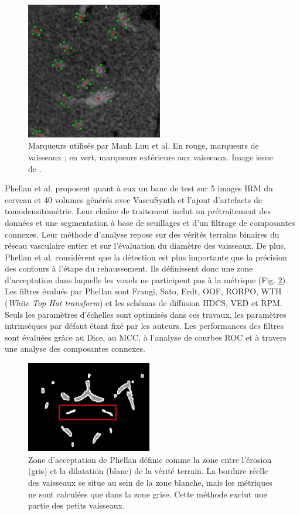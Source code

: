 \begin{figure}[!ht]
  \centering
  \includegraphics[height=6cm]{Images/ManhLuu_markers.png}
  \caption{Marqueurs utilisés par Manh Luu et al. En rouge, marqueurs de vaisseaux ; en vert, marqueurs extérieurs aux vaisseaux. Image issue de \cite{Luu2015_liver_vesselness_comparison}. }
  \label{fig:ManhLuu_markers}
\end{figure}

Phellan et al. \cite{Phellan2017_Brain_vesselness_comparison} proposent quant à eux un banc de test sur 5 images IRM du cerveau et 40 volumes générés avec VascuSynth et l'ajout d'artefacts de tomodensitométrie. Leur chaîne de traitement inclut un prétraitement des données et une segmentation à base de seuillages et d'un filtrage de composantes connexes. Leur méthode d'analyse repose sur des vérités terrains binaires du réseau vasculaire entier et sur l'évaluation du diamètre des vaisseaux. De plus, Phellan et al. considèrent que la détection est plus importante que la précision des contours à l'étape du rehaussement. Ils définissent donc une zone d'acceptation dans laquelle les voxels ne participent pas à la métrique (Fig. \ref{fig:Phellan_acceptance_zone}). Les filtres évalués par Phellan sont Frangi, Sato, Erdt, OOF, RORPO, WTH (\textit{White Top Hat transform}) \cite{Soille1999_WTH} et les schémas de diffusion HDCS, VED et RPM. Seuls les paramètres d'échelles sont optimisés dans ces travaux, les paramètres intrinsèques par défaut étant fixé par les auteurs. Les performances des filtres sont évaluées grâce au Dice, au MCC, à l'analyse de courbes ROC et à travers une analyse des composantes connexes.

\begin{figure}[!ht]
  \centering
  \includegraphics[height=4cm]{Images/Phellan_comparison.jpg}
  \caption{Zone d'acceptation de Phellan définie comme la zone entre l'érosion (gris) et la dilatation (blanc) de la vérité terrain. La bordure réelle des vaisseaux se situe au sein de la zone blanche, mais les métriques ne sont calculées que dans la zone grise. Cette méthode exclut une partie des petits vaisseaux.}
  \label{fig:Phellan_acceptance_zone}
\end{figure}

